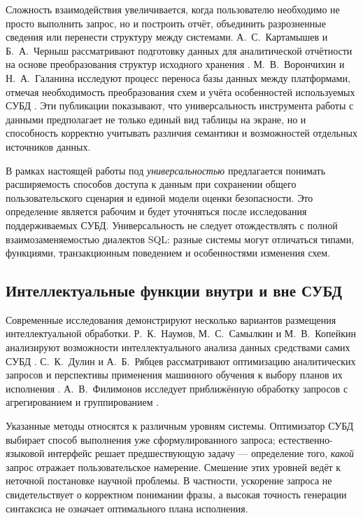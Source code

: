 Сложность взаимодействия увеличивается, когда пользователю необходимо не просто выполнить запрос, но и построить отчёт, объединить разрозненные сведения или перенести структуру между системами. А.~С.~Картамышев и Б.~А.~Черныш рассматривают подготовку данных для аналитической отчётности на основе преобразования структур исходного хранения \cite{kartamyshev2023}. М.~В.~Ворончихин и Н.~А.~Галанина исследуют процесс переноса базы данных между платформами, отмечая необходимость преобразования схем и учёта особенностей используемых СУБД \cite{voronchikhin2024}. Эти публикации показывают, что универсальность инструмента работы с данными предполагает не только единый вид таблицы на экране, но и способность корректно учитывать различия семантики и возможностей отдельных источников данных.

В рамках настоящей работы под \emph{универсальностью} предлагается понимать расширяемость способов доступа к данным при сохранении общего пользовательского сценария и единой модели оценки безопасности. Это определение является рабочим и будет уточняться после исследования поддерживаемых СУБД. Универсальность не следует отождествлять с полной взаимозаменяемостью диалектов SQL: разные системы могут отличаться типами, функциями, транзакционным поведением и особенностями изменения схем.

\subsection{Интеллектуальные функции внутри и вне СУБД}

Современные исследования демонстрируют несколько вариантов размещения интеллектуальной обработки. Р.~К.~Наумов, М.~С.~Самылкин и М.~В.~Копейкин анализируют возможности интеллектуального анализа данных средствами самих СУБД \cite{naumov2021}. С.~К.~Дулин и А.~Б.~Рябцев рассматривают оптимизацию аналитических запросов и перспективы применения машинного обучения к выбору планов их исполнения \cite{dulin2023}. А.~В.~Филимонов исследует приближённую обработку запросов с агрегированием и группированием \cite{filimonov2022}.

Указанные методы относятся к различным уровням системы. Оптимизатор СУБД выбирает способ выполнения уже сформулированного запроса; естественно-языковой интерфейс решает предшествующую задачу — определение того, \emph{какой} запрос отражает пользовательское намерение. Смешение этих уровней ведёт к неточной постановке научной проблемы. В частности, ускорение запроса не свидетельствует о корректном понимании фразы, а высокая точность генерации синтаксиса не означает оптимального плана исполнения.

